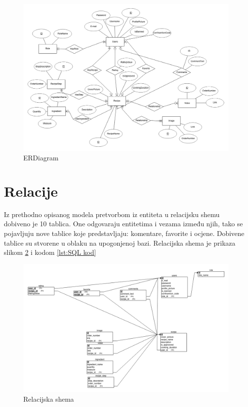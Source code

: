 \documentclass[times, utf8, zavrsni]{fer}
\begin{document}
\begin{figure}
      \includegraphics[width=\textwidth]{ERDiagram.png}
      \caption{ERDiagram}
      \label{fig:ER Diagram}
\end{figure}

\section{Relacije}
Iz prethodno opisanog modela pretvorbom iz entiteta u relacijsku shemu dobiveno je 10
tablica. One odgovaraju
entitetima i vezama između njih, tako se pojavljuju nove tablice koje predstavljaju:
komentare, favorite i ocjene. Dobivene tablice su stvorene u oblaku na upogonjenoj bazi.
Relacijska shema je prikaza slikom \ref{fig:Relacijska shema} i kodom \ref{lst:SQL kod}

\begin{figure}
      \includegraphics[width=\textwidth]{RelationalSchema.png}
      \caption{Relacijska shema}
      \label{fig:Relacijska shema}
\end{figure}
\end{document}
